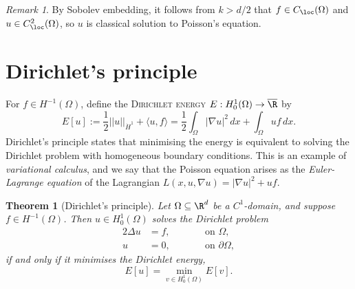 \documentclass[reqno]{amsart}
\newtheorem{theorem}{Theorem}
\theoremstyle{definition}
\theoremstyle{remark}
\newtheorem*{remark}{Remark}
\newcounter{problem}[section]	\declaretheorem[style=thmrecbox,name=Problem, numberlike=problem]{statement}
\renewcommand{\emph}{\textsc}
\begin{document}
\begin{remark}
	By Sobolev embedding, it follows from $k > d/2$ that $f \in C_{\loc} (\Omega)$ and $u \in C^2_{\loc} (\Omega)$, so $u$ is classical solution to Poisson's equation. 
\end{remark}

\section{Dirichlet's principle}

For $f \in H^{-1} (\Omega)$, define the \emph{Dirichlet energy} $E : H^1_0 (\Omega) \to \overline \R$ by 
	\[ E[u] := \frac12 ||u||_{\dot H^1} + \langle u, f \rangle = \frac12 \int_\Omega |\nabla u|^2 \, dx + \int_\Omega u f \, dx. \]
Dirichlet's principle states that minimising the energy is equivalent to solving the Dirichlet problem with homogeneous boundary conditions. This is an example of \textit{variational calculus}, and we say that the Poisson equation arises as the \textit{Euler-Lagrange equation} of the Lagrangian $L(x, u, \nabla u) = |\nabla u|^2 + u f$. 

\begin{theorem}[Dirichlet's principle]
	Let $\Omega \subseteq \R^d$ be a $C^1$-domain, and suppose $f \in H^{-1} (\Omega)$. Then $u \in H^1_0 (\Omega)$ solves the Dirichlet problem	
		\begin{alignat*}{2}
		\Delta u
			&= f, \qquad  && \text{on } \Omega, \\
		u
			&= 0,					\qquad && \text{on } \partial \Omega,
	\end{alignat*} 
	if and only if it minimises the Dirichlet energy, 
		\[ E[u] = \min_{v \in H^1_0 (\Omega)} E[v].  \]
\end{theorem}	
\end{document}
